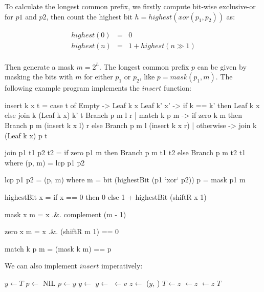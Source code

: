 \documentclass[b5paper]{article}
\begin{document}
To calculate the longest common prefix, we firstly compute bit-wise exclusive-or for $p1$ and $p2$, then count the highest bit $h = highest(xor(p_1, p_2))$ as:

\[
\begin{array}{rcl}
highest(0) & = & 0 \\
highest(n) & = & 1 + highest(n \gg 1) \\
\end{array}
\]

Then generate a mask $m = 2^h$. The longest common prefix $p$ can be given by masking the bits with $m$ for either $p_1$ or $p_2$, like $p = mask(p_1, m)$. The following example program implements the $insert$ function:

\begin{Haskell}
insert k x t
   = case t of
       Empty -> Leaf k x
       Leaf k' x' -> if k == k' then Leaf k x
                     else join k (Leaf k x) k' t
       Branch p m l r
          | match k p m -> if zero k m
                           then Branch p m (insert k x l) r
                           else Branch p m l (insert k x r)
          | otherwise -> join k (Leaf k x) p t

join p1 t1 p2 t2 = if zero p1 m then Branch p m t1 t2
                                else Branch p m t2 t1
    where
      (p, m) = lcp p1 p2

lcp p1 p2 = (p, m) where
    m = bit (highestBit (p1 `xor` p2))
    p = mask p1 m

highestBit x = if x == 0 then 0 else 1 + highestBit (shiftR x 1)

mask x m = x .&. complement (m - 1)

zero x m = x .&. (shiftR m 1) == 0

match k p m = (mask k m) == p
\end{Haskell}

We can also implement $insert$ imperatively:

\begin{algorithmic}[1]
    \State \Return {}
  \EndIf
  \State $y \gets T$
  \State $p \gets$ NIL
    \State $p \gets y$
      \State $y \gets$ 
    \Else
      \State $y \gets$ 
    \EndIf
  \EndWhile
    \State {} $\gets v$
  \Else
    \State $z \gets$ ($y$, )
      \State $T \gets z$
    \Else
        \State {} $\gets z$
      \Else
        \State {} $\gets z$
      \EndIf
    \EndIf
  \EndIf
  \State \Return $T$
\EndFunction
\end{algorithmic}
\end{document}

